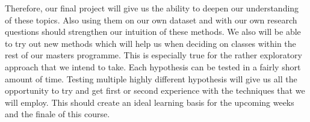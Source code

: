 \documentclass[11pt,a4paper]{article}
\begin{document}
Therefore, our final project will give us the ability to deepen our understanding of these topics. Also using them on our own dataset and with our own research questions should strengthen our intuition of these methods.
We also will be able to try out new methods which will help us when deciding on classes within the rest of our masters programme. This is especially true for the rather exploratory approach that we intend to take. Each hypothesis can be tested in a fairly short amount of time. Testing multiple highly different hypothesis will give us all the opportunity to try and get first or second experience with the techniques that we will employ. This should create an ideal learning basis for the upcoming weeks and the finale of this course.




\end{document}
